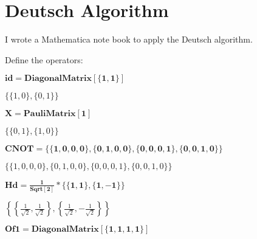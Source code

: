 

\section{Deutsch Algorithm}
I wrote a Mathematica note book to apply the Deutsch algorithm.

Define the operators:

\begin{doublespace}
\noindent\(\pmb{\text{id} = \text{DiagonalMatrix}[\{1, 1\}]}\)
\end{doublespace}

\begin{doublespace}
\noindent\(\{\{1,0\},\{0,1\}\}\)
\end{doublespace}

\begin{doublespace}
\noindent\(\pmb{X = \text{PauliMatrix}[1]}\)
\end{doublespace}

\begin{doublespace}
\noindent\(\{\{0,1\},\{1,0\}\}\)
\end{doublespace}

\begin{doublespace}
\noindent\(\pmb{\text{CNOT} = \{\{1, 0, 0, 0\}, \{0, 1, 0, 0\}, \{0, 0, 0, 1\}, \{0, 0, 1, 0\}\}}\)
\end{doublespace}

\begin{doublespace}
\noindent\(\{\{1,0,0,0\},\{0,1,0,0\},\{0,0,0,1\},\{0,0,1,0\}\}\)
\end{doublespace}

\begin{doublespace}
\noindent\(\pmb{\text{Hd} = \frac{1}{\text{Sqrt}[2]}*\{\{1, 1\}, \{1, -1\}\}}\)
\end{doublespace}

\begin{doublespace}
\noindent\(\left\{\left\{\frac{1}{\sqrt{2}},\frac{1}{\sqrt{2}}\right\},\left\{\frac{1}{\sqrt{2}},-\frac{1}{\sqrt{2}}\right\}\right\}\)
\end{doublespace}

\begin{doublespace}
\noindent\(\pmb{\text{Of1} = \text{DiagonalMatrix}[\{1, 1, 1, 1\}]}\)
\end{doublespace}

